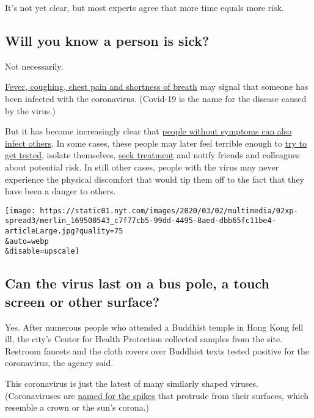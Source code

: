 It's not yet clear, but most experts agree that more time equals more
risk.

\hypertarget{will-you-know-a-person-is-sick}{%
\subsection{Will you know a person is
sick?}\label{will-you-know-a-person-is-sick}}

Not necessarily.

\href{https://www.nytimes.com/article/coronavirus-body-symptoms.html}{Fever,
coughing, chest pain and shortness of breath} may signal that someone
has been infected with the coronavirus. (Covid-19 is the name for the
disease caused by the virus.)

But it has become increasingly clear that
\href{https://www.nytimes.com/2020/02/26/health/coronavirus-asymptomatic.html}{people
without symptoms can also infect others}. In some cases, these people
may later feel terrible enough to
\href{https://www.nytimes.com/2020/03/18/nyregion/coronavirus-testing-positive.html}{try
to get tested}, isolate themselves,
\href{https://www.nytimes.com/2020/03/17/science/coronavirus-treatment.html}{seek
treatment} and notify friends and colleagues about potential risk. In
still other cases, people with the virus may never experience the
physical discomfort that would tip them off to the fact that they have
been a danger to others.

\texttt{[image: https://static01.nyt.com/images/2020/03/02/multimedia/02xp-spread3/merlin\_169500543\_c7f77cb5-99dd-4495-8aed-dbb65fc11be4-articleLarge.jpg?quality=75\\\&auto=webp\\\&disable=upscale]}

\hypertarget{can-the-virus-last-on-a-bus-pole-a-touch-screen-or-other-surface}{%
\subsection{Can the virus last on a bus pole, a touch screen or other
surface?}\label{can-the-virus-last-on-a-bus-pole-a-touch-screen-or-other-surface}}

Yes. After numerous people who attended a Buddhist temple in Hong Kong
fell ill, the city's Center for Health Protection collected samples from
the site. Restroom faucets and the cloth covers over Buddhist texts
tested positive for the coronavirus, the agency said.

This coronavirus is just the latest of many similarly shaped viruses.
(Coronaviruses are
\href{https://www.nytimes.com/article/what-is-coronavirus.html}{named
for the spikes} that protrude from their surfaces, which resemble a
crown or the sun's corona.)

